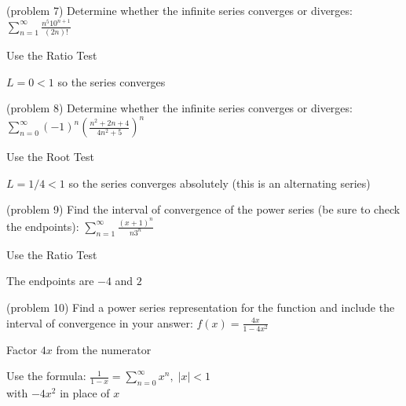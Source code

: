 \documentclass[handout]{ximera}
\begin{document}
\begin{problem}(problem 7)
Determine whether the infinite series converges or diverges: $\displaystyle \sum_{n=1}^\infty \frac{n^5 10^{n+1}}{(2n)!}$

\begin{hint}
Use the Ratio Test
\end{hint}

\begin{hint}
$L = 0 < 1$ so the series converges
\end{hint}

\end{problem}


\begin{problem}(problem 8)
Determine whether the infinite series converges or diverges: $\displaystyle \sum_{n=0}^\infty (-1)^n\left(\frac{n^2 + 2n+ 4}{4n^2 + 5}\right)^n$

\begin{hint}
Use the Root Test
\end{hint}

\begin{hint}
$L = 1/4 < 1$ so the series converges absolutely (this is an alternating series)
\end{hint}

\end{problem}

\begin{problem} (problem 9)
Find the interval of convergence of the power series (be sure to check the endpoints):
$\displaystyle \sum_{n=1}^\infty \frac{(x + 1)^n}{n 3^n}$

\begin{hint}
Use the Ratio Test
\end{hint}
\begin{hint}
The endpoints are $-4$ and $2$
\end{hint}

\end{problem}


\begin{problem} (problem 10)
Find a power series representation for the function and include the interval of convergence in your answer:
$\displaystyle f(x) = \frac{4x}{1 - 4x^2}$

\begin{hint}
Factor $4x$ from the numerator
\end{hint}
\begin{hint}
Use the formula: $\displaystyle \frac{1}{1-x} = \sum_{n = 0}^\infty x^n, \; |x| <1$\\
with $-4x^2$ in place of $x$
\end{hint}

\end{problem}
\end{document}
